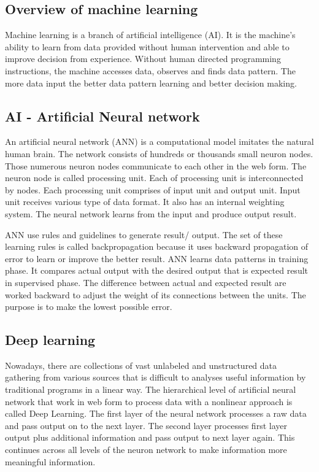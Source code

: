 \documentclass[12pt,oneside,openright,a4paper]{cpe-english-project}
\begin{document}
\subsection{Overview of machine learning}
\hspace{10mm}Machine learning is a branch of artificial intelligence (AI).  It is the machine’s ability to learn from data provided without human intervention and able to improve decision from experience.  Without human directed programming instructions, the machine accesses data, observes and finds data pattern.  The more data input the better data pattern learning and better decision making.\cite{ml}

\subsection{AI - Artificial Neural network}
\hspace{10mm}An artificial neural network (ANN) is a computational model imitates the natural human brain. The network consists of hundreds or thousands small neuron nodes. Those numerous neuron nodes communicate to each other in the web form. The neuron node is called processing unit. Each of processing unit is interconnected by nodes. Each processing unit comprises of input unit and output unit. Input unit receives various type of data format. It also has an internal weighting system. The neural network learns from the input and produce output result.

\hspace{10mm}ANN use rules and guidelines to generate result/ output. The set of these learning rules is called backpropagation because it uses backward propagation of error to learn or improve the better result. ANN learns data patterns in training phase. It compares actual output with the desired output that is expected result in supervised phase. The difference between actual and expected result are worked backward to adjust the weight of its connections between the units. The purpose is to make the lowest possible error. \cite{ann}

\subsection{Deep learning}
\hspace{10mm}Nowadays, there are collections of vast unlabeled and unstructured data gathering from various sources that is difficult to analyses useful information by traditional programs in a linear way.  The hierarchical level of artificial neural network that work in web form to process data with a nonlinear approach is called Deep Learning.  The first layer of the neural network processes a raw data and pass output on to the next layer. The second layer processes first layer output plus additional information and pass output to next layer again. This continues across all levels of the neuron network to make information more meaningful information. \cite{deepLearning}
\end{document}
